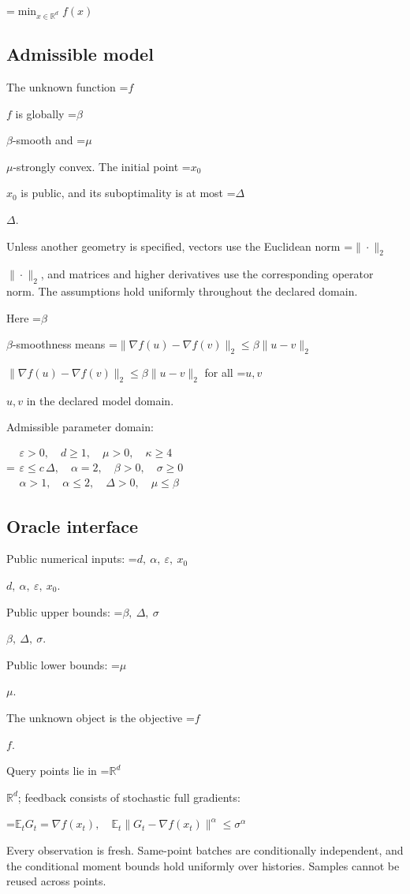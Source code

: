 \documentclass[10pt,a4paper]{article}
\newcommand{\AtlasMath}[1]{\par\begingroup\centering\setbox0=\hbox{$\displaystyle #1$}\ifdim\wd0>1.4\linewidth\typeout{ATLAS WIDE FORMULA: \the\wd0}\fi\ifdim\wd0>\linewidth\resizebox{\linewidth}{!}{\box0}\else\box0\fi\par\endgroup}
\newcommand{\AtlasInlineMath}[1]{\begingroup\setbox0=\hbox{$#1$}\ifdim\wd0>.4\linewidth\endgroup\AtlasMath{#1}\else\endgroup$#1$\fi}
\begin{document}
\AtlasMath{\min_{x\in \mathbb{R}^d}f(x)}


\subsection{Admissible model}
The unknown function \AtlasInlineMath{f} is globally \AtlasInlineMath{\beta}-smooth and \AtlasInlineMath{\mu}-strongly convex. The initial point \AtlasInlineMath{x_0} is public, and its suboptimality is at most \AtlasInlineMath{\Delta}.

Unless another geometry is specified, vectors use the Euclidean norm \AtlasInlineMath{\|\cdot\|_2}, and matrices and higher derivatives use the corresponding operator norm. The assumptions hold uniformly throughout the declared domain.

Here \AtlasInlineMath{\beta}-smoothness means \AtlasInlineMath{\|\nabla f(u)-\nabla f(v)\|_2\le\beta\|u-v\|_2} for all \AtlasInlineMath{u,v} in the declared model domain.

Admissible parameter domain:


\AtlasMath{\begin{gathered}\varepsilon > 0,\quad d \ge 1,\quad \mu > 0,\quad \kappa \ge 4\\\varepsilon \le c\,\Delta,\quad \alpha = 2,\quad \beta > 0,\quad \sigma \ge 0\\\alpha > 1,\quad \alpha \le 2,\quad \Delta > 0,\quad \mu \le \beta\end{gathered}}


\subsection{Oracle interface}
Public numerical inputs: \AtlasInlineMath{d,\ \alpha,\ \varepsilon,\ x_0}.

Public upper bounds: \AtlasInlineMath{\beta,\ \Delta,\ \sigma}.

Public lower bounds: \AtlasInlineMath{\mu}.

The unknown object is the objective \AtlasInlineMath{f}.

Query points lie in \AtlasInlineMath{\mathbb{R}^d}; feedback consists of stochastic full gradients:


\AtlasMath{\mathbb{E}_tG_t=\nabla f(x_t),\quad\mathbb{E}_t\|G_t-\nabla f(x_t)\|^\alpha\le\sigma^\alpha}


Every observation is fresh. Same-point batches are conditionally independent, and the conditional moment bounds hold uniformly over histories. Samples cannot be reused across points.
\end{document}
